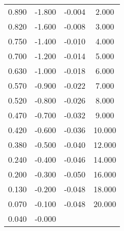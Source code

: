 \begin{table}
\begin{tabular}{c c || c c}
        0.890         &         -1.800  &  -0.004       &           2.000    \\    
        0.820         &         -1.600  &  -0.008       &           3.000    \\    
        0.750         &         -1.400  &  -0.010       &           4.000    \\    
        0.700         &         -1.200  &  -0.014       &           5.000    \\    
        0.630         &         -1.000  &  -0.018       &           6.000    \\    
        0.570         &         -0.900  &  -0.022       &           7.000    \\    
        0.520         &         -0.800  &  -0.026       &           8.000    \\    
        0.470         &         -0.700  &  -0.032       &           9.000    \\    
        0.420         &         -0.600  &  -0.036       &          10.000    \\    
        0.380         &         -0.500  &  -0.040       &          12.000    \\    
        0.240         &         -0.400  &  -0.046       &          14.000    \\    
        0.200         &         -0.300  &  -0.050       &          16.000    \\    
        0.130         &         -0.200  &  -0.048       &          18.000    \\    
        0.070         &         -0.100  &  -0.048       &          20.000    \\    
        0.040         &         -0.000  &               &                    \\
        \bottomrule
    \end{tabular}
\end{table}

